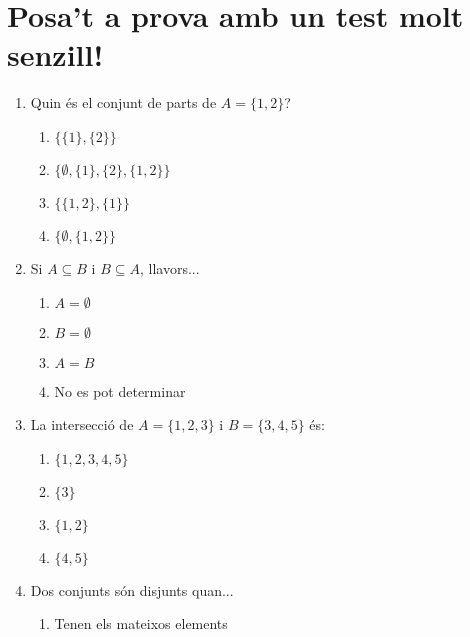 
\section{Posa't a prova amb un test molt senzill!}

\begin{enumerate}

\item Quin \'{e}s el conjunt de parts de $A=\{1,2\}$?

\begin{enumerate}
\item $\{\{1\},\{2\}\}$

\item $\{\emptyset,\{1\},\{2\},\{1,2\}\}$

\item $\{\{1,2\},\{1\}\}$

\item $\{\emptyset,\{1,2\}\}$
\end{enumerate}

\item Si $A\subseteq B$ i $B\subseteq A$, llavors...

\begin{enumerate}
\item $A=\emptyset$

\item $B=\emptyset$

\item $A=B$

\item No es pot determinar
\end{enumerate}

\item La intersecci\'{o} de $A=\{1,2,3\}$ i $B=\{3,4,5\}$ \'{e}s:

\begin{enumerate}
\item $\{1,2,3,4,5\}$

\item $\{3\}$

\item $\{1,2\}$

\item $\{4,5\}$
\end{enumerate}

\item Dos conjunts s\'{o}n disjunts quan...

\begin{enumerate}
\item Tenen els mateixos elements


\end{enumerate}
\end{enumerate}

